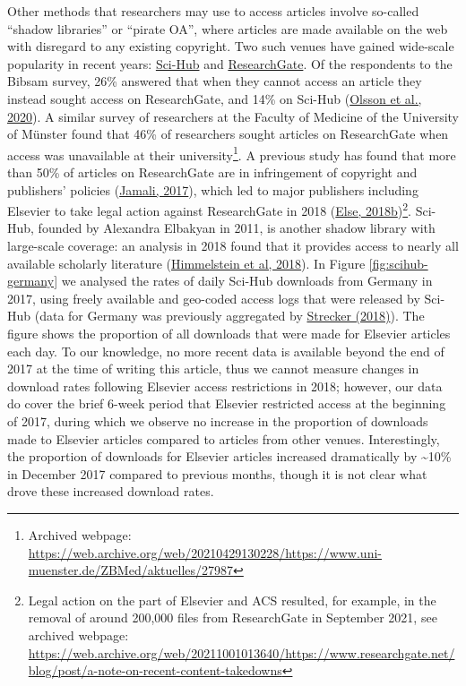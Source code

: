 \documentclass[
]{article}
\begin{document}
Other methods that researchers may use to access articles involve so-called ``shadow libraries'' or ``pirate OA'', where articles are made available on the web with disregard to any existing copyright. Two such venues have gained wide-scale popularity in recent years: \href{https://sci-hub.se/}{Sci-Hub} and \href{https://www.researchgate.net/}{ResearchGate}. Of the respondents to the Bibsam survey, 26\% answered that when they cannot access an article they instead sought access on ResearchGate, and 14\% on Sci-Hub (\href{http://doi.org/10.1629/uksg.507}{Olsson et al., 2020}). A similar survey of researchers at the Faculty of Medicine of the University of Münster found that 46\% of researchers sought articles on ResearchGate when access was unavailable at their university\footnote{Archived webpage: \url{https://web.archive.org/web/20210429130228/https://www.uni-muenster.de/ZBMed/aktuelles/27987}}. A previous study has found that more than 50\% of articles on ResearchGate are in infringement of copyright and publishers' policies (\href{https://doi.org/10.1007/s11192-017-2291-4}{Jamali, 2017}), which led to major publishers including Elsevier to take legal action against ResearchGate in 2018 (\href{https://doi.org/10.1038/d41586-018-06945-6}{Else, 2018b})\footnote{Legal action on the part of Elsevier and ACS resulted, for example, in the removal of around 200,000 files from ResearchGate in September 2021, see archived webpage: \url{https://web.archive.org/web/20211001013640/https://www.researchgate.net/blog/post/a-note-on-recent-content-takedowns}}. Sci-Hub, founded by Alexandra Elbakyan in 2011, is another shadow library with large-scale coverage: an analysis in 2018 found that it provides access to nearly all available scholarly literature (\href{https://doi.org/10.7554/eLife.32822}{Himmelstein et al, 2018}). In Figure \ref{fig:scihub-germany} we analysed the rates of daily Sci-Hub downloads from Germany in 2017, using freely available and geo-coded access logs that were released by Sci-Hub (data for Germany was previously aggregated by \href{http://doi.org/10.5281/zenodo.1286284}{Strecker (2018)}). The figure shows the proportion of all downloads that were made for Elsevier articles each day. To our knowledge, no more recent data is available beyond the end of 2017 at the time of writing this article, thus we cannot measure changes in download rates following Elsevier access restrictions in 2018; however, our data do cover the brief 6-week period that Elsevier restricted access at the beginning of 2017, during which we observe no increase in the proportion of downloads made to Elsevier articles compared to articles from other venues. Interestingly, the proportion of downloads for Elsevier articles increased dramatically by \textasciitilde10\% in December 2017 compared to previous months, though it is not clear what drove these increased download rates.
\end{document}

